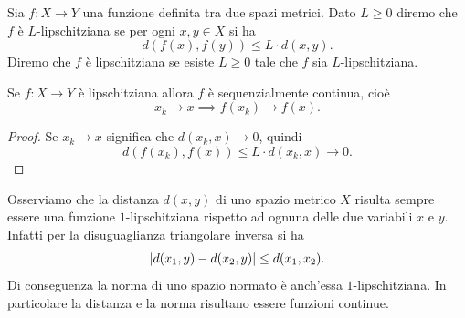 \begin{definition}[lipschitz]
\mymark{***}
Sia $f\colon X \to Y$ una funzione definita tra due spazi metrici.
Dato $L\ge 0$
diremo che $f$ è $L$-lipschitziana se
per ogni $x,y \in X$ si ha
\[
  d(f(x),f(y)) \le L \cdot d(x,y).
\]
Diremo che $f$ è lipschitziana se esiste $L\ge 0$ tale che $f$ sia $L$-lipschitziana.
\end{definition}

\begin{theorem}
\label{th:lipschitz_uniformemente_continua}%
\mymark{*}%
Se $f\colon X \to Y$ è lipschitziana allora
$f$ è sequenzialmente continua, cioè
\[
  x_k \to x \implies f(x_k)\to f(x).
\]
\end{theorem}
%
\begin{proof}
Se $x_k\to x$ significa che $d(x_k,x) \to 0$, quindi
\[
  d(f(x_k), f(x)) \le L \cdot d(x_k,x) \to 0.
\]
\end{proof}

Osserviamo che la distanza $d(x,y)$ di uno spazio metrico $X$ risulta sempre essere una funzione $1$-lip\-schit\-zia\-na rispetto ad ognuna delle due variabili $x$ e $y$. Infatti per la disuguaglianza triangolare inversa si ha
\[
  {\left|d(x_1,y) - d(x_2,y)\right|} \le d(x_1, x_2).
\]
Di conseguenza la norma di uno spazio normato è anch'essa $1$-lip\-schit\-zia\-na. 
In particolare la distanza e la norma risultano essere funzioni continue.

